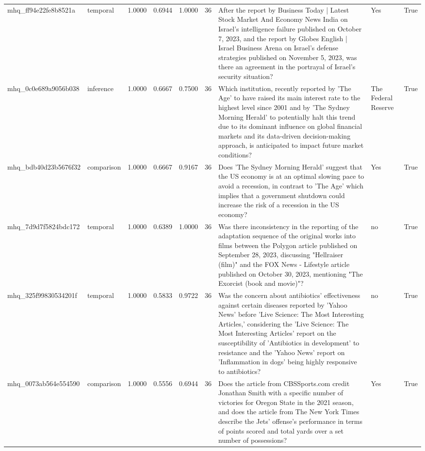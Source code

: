 \begin{tabular}{llrrrrllr}
mhq_ff94e22fe8b8521a & temporal & 1.0000 & 0.6944 & 1.0000 & 36 & After the report by Business Today | Latest Stock Market And Economy News India on Israel's intelligence failure published on October 7, 2023, and the report by Globes English | Israel Business Arena on Israel's defense strategies published on November 5, 2023, was there an agreement in the portrayal of Israel's security situation? & Yes & True \\
mhq_0c0e689a9056b038 & inference & 1.0000 & 0.6667 & 0.7500 & 36 & Which institution, recently reported by 'The Age' to have raised its main interest rate to the highest level since 2001 and by 'The Sydney Morning Herald' to potentially halt this trend due to its dominant influence on global financial markets and its data-driven decision-making approach, is anticipated to impact future market conditions? & The Federal Reserve & True \\
mhq_bdb40d23b5676f32 & comparison & 1.0000 & 0.6667 & 0.9167 & 36 & Does 'The Sydney Morning Herald' suggest that the US economy is at an optimal slowing pace to avoid a recession, in contrast to 'The Age' which implies that a government shutdown could increase the risk of a recession in the US economy? & Yes & True \\
mhq_7d9d7f5824bdc172 & temporal & 1.0000 & 0.6389 & 1.0000 & 36 & Was there inconsistency in the reporting of the adaptation sequence of the original works into films between the Polygon article published on September 28, 2023, discussing "Hellraiser (film)" and the FOX News - Lifestyle article published on October 30, 2023, mentioning "The Exorcist (book and movie)"? & no & True \\
mhq_325f99830534201f & temporal & 1.0000 & 0.5833 & 0.9722 & 36 & Was the concern about antibiotics' effectiveness against certain diseases reported by 'Yahoo News' before 'Live Science: The Most Interesting Articles,' considering the 'Live Science: The Most Interesting Articles' report on the susceptibility of 'Antibiotics in development' to resistance and the 'Yahoo News' report on 'Inflammation in dogs' being highly responsive to antibiotics? & no & True \\
mhq_0073ab564e554590 & comparison & 1.0000 & 0.5556 & 0.6944 & 36 & Does the article from CBSSports.com credit Jonathan Smith with a specific number of victories for Oregon State in the 2021 season, and does the article from The New York Times describe the Jets' offense's performance in terms of points scored and total yards over a set number of possessions? & Yes & True \\

\end{tabular}
